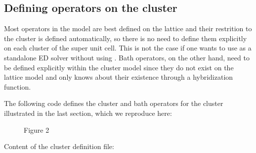 \documentclass[letterpaper,10pt,english]{sphinxmanual}
\let\sphinxpxdimen\pdfpxdimen\else\newdimen\sphinxpxdimen
\begin{document}
\subsection{Defining operators on the cluster}
\label{\detokenize{defining_models:defining-operators-on-the-cluster}}
\sphinxAtStartPar
Most operators in the model are best defined on the lattice and their restrition to the cluster is defined automatically, so there is no need to define them explicitly on each cluster of the super unit cell. This is not the case if one wants to use  as a standalone ED solver without using .
Bath operators, on the other hand, need to be defined explicitly within the cluster model since they do not exist on the lattice model and  only knows about their existence through a hybridization function.

\sphinxAtStartPar
The following code defines the cluster and bath operators for the cluster illustrated in the last section, which we reproduce here:

\begin{figure}[htbp]
\centering
\capstart

\noindent\sphinxincludegraphics[height=200\sphinxpxdimen]{{h4-6b}.png}
\caption{Figure 2}\label{\detokenize{defining_models:id2}}\end{figure}

\sphinxAtStartPar
Content of the cluster definition file:
\end{document}
